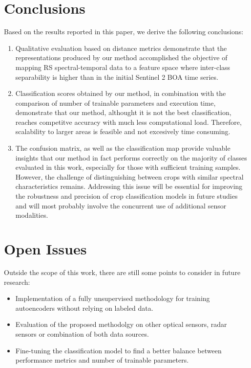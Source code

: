 \documentclass[journal,article,submit,pdftex,moreauthors]{Definitions/mdpi}
\begin{document}
\section{Conclusions}
Based on the results reported in this paper, we derive the following conclusions:
\begin{enumerate}
	\item Qualitative evaluation based on distance metrics demonstrate that the representations produced by our method accomplished the objective of mapping RS spectral-temporal data to a feature space where inter-class separability is higher than in the initial Sentinel 2 BOA time series.
	\item Classification scores obtained by our method, in combination with the comparison of number of trainable parameters and execution time, demonstrate that our method, althought it is not the best classification, reaches competitve accuracy with much less computational load. Therefore, scalability to larger areas is feasible and not excesively time consuming.
	\item The confusion matrix, as well as the classification map provide valuable insights that our method in fact performs correctly on the majority of classes evaluated in this work, especially for those with sufficient training samples. However, the challenge of distinguishing between crops with similar spectral characteristics remains. Addressing this issue will be essential for improving the robustness and precision of crop classification models in future studies and will most probably involve the concurrent use of additional sensor modalities.
\end{enumerate}

\section{Open Issues}
Outside the scope of this work, there are still some points to consider in future research:
\begin{itemize}
	\item Implementation of a fully unsupervised methodology for training autoencoders without relying on labeled data.
	\item Evaluation of the proposed methodolgy on other optical sensors, radar sensors or combination of both data sources.
	\item Fine-tuning the classification model to find a better balance between performance metrics and number of trainable parameters.
\end{itemize}
\end{document}
